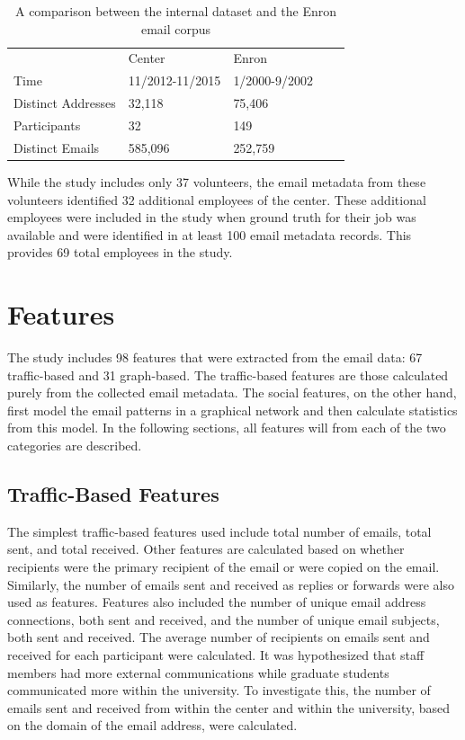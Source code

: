 \documentclass{article}
\begin{document}
\begin{table}[H]
\centering
\caption{A comparison between the internal dataset and the Enron email corpus}
\label{tab:db_stats}
\begin{tabular}{l|l|l|ll}
\cline{2-3}
                                         & Center          & Enron         &  &  \\ \cline{1-3}
\multicolumn{1}{|l|}{Time}               & 11/2012-11/2015 & 1/2000-9/2002 &  &  \\
\multicolumn{1}{|l|}{Distinct Addresses} & 32,118          & 75,406        &  &  \\
\multicolumn{1}{|l|}{Participants}       & 32              & 149           &  &  \\
\multicolumn{1}{|l|}{Distinct Emails}    & 585,096         & 252,759       &  &  \\ \cline{1-3}
\end{tabular}
\end{table}

While the study includes only 37 volunteers, the email metadata from these volunteers identified 32 additional employees of the center.  These additional employees were included in the study when ground truth for their job was available and were identified in at least 100 email metadata records.  This provides 69 total employees in the study.

\section{Features} \label{Features}
The study includes 98 features that were extracted from the email data: 67 traffic-based and 31 graph-based.  The traffic-based features are those calculated purely from the collected email metadata.  The social features, on the other hand, first model the email patterns in a graphical network and then calculate statistics from this model.  In the following sections, all features will from each of the two categories are described. 

\subsection{Traffic-Based Features}
The simplest traffic-based features used include total number of emails, total sent, and total received.  Other features are calculated based on whether recipients were the primary recipient of the email or were copied on the email.  Similarly, the number of emails sent and received as replies or forwards were also used as features.  Features also included the number of unique email address connections, both sent and received,  and the number of unique email subjects, both sent and received.  The average number of recipients on emails sent and received for each participant were calculated.  It was hypothesized that staff members had more external communications while graduate students communicated more within the university.  To investigate this, the number of emails sent and received from within the center and within the university, based on the domain of the email address, were calculated.  
\end{document}
